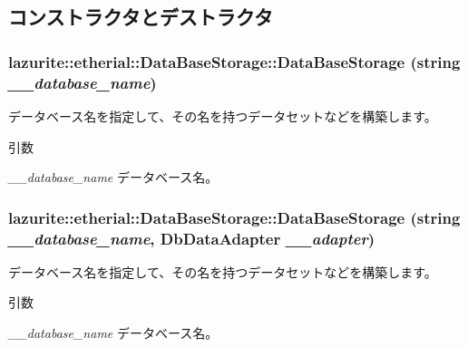 \subsection{コンストラクタとデストラクタ}
\hypertarget{classlazurite_1_1etherial_1_1_data_base_storage_ac3e690a84cb81e9b92054e2c8195c39f}{
\subsubsection[{DataBaseStorage}]{\setlength{\rightskip}{0pt plus 5cm}lazurite::etherial::DataBaseStorage::DataBaseStorage (string {\em \_\-\_\-database\_\-name})}}
\label{classlazurite_1_1etherial_1_1_data_base_storage_ac3e690a84cb81e9b92054e2c8195c39f}
データベース名を指定して、その名を持つデータセットなどを構築します。 
\begin{DoxyParams}{引数}
\item[{\em \_\-\_\-database\_\-name}]データベース名。 \end{DoxyParams}
\hypertarget{classlazurite_1_1etherial_1_1_data_base_storage_a4602bffc4672a2df0292d4a39ee52def}{
\subsubsection[{DataBaseStorage}]{\setlength{\rightskip}{0pt plus 5cm}lazurite::etherial::DataBaseStorage::DataBaseStorage (string {\em \_\-\_\-database\_\-name}, \/  DbDataAdapter {\em \_\-\_\-adapter})}}
\label{classlazurite_1_1etherial_1_1_data_base_storage_a4602bffc4672a2df0292d4a39ee52def}
データベース名を指定して、その名を持つデータセットなどを構築します。 
\begin{DoxyParams}{引数}
\item[{\em \_\-\_\-database\_\-name}]データベース名。 \end{DoxyParams}


